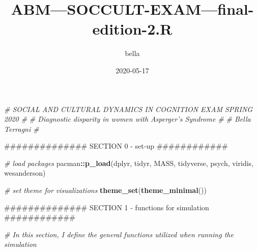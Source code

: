 \documentclass[]{article}
\title{ABM---SOCCULT-EXAM---final-edition-2.R}
\author{bella}
\date{2020-05-17}
\newenvironment{Shaded}{\begin{snugshade}}{\end{snugshade}}
\newcommand{\KeywordTok}[1]{\textcolor[rgb]{0.13,0.29,0.53}{\textbf{#1}}}
\newcommand{\CommentTok}[1]{\textcolor[rgb]{0.56,0.35,0.01}{\textit{#1}}}
\newcommand{\OperatorTok}[1]{\textcolor[rgb]{0.81,0.36,0.00}{\textbf{#1}}}
\newcommand{\NormalTok}[1]{#1}
\begin{document}
\maketitle

\begin{Shaded}
\begin{Highlighting}[]
\CommentTok{# SOCIAL AND CULTURAL DYNAMICS IN COGNITION EXAM SPRING 2020 #}
\CommentTok{# Diagnostic disparity in women with Asperger's Syndrome #}
\CommentTok{# Bella Terragni #}


\NormalTok{############## SECTION 0 - set-up ############}

\CommentTok{# load packages}
\NormalTok{pacman}\OperatorTok{::}\KeywordTok{p_load}\NormalTok{(dplyr, tidyr, MASS, tidyverse, psych, viridis, wesanderson)}

\CommentTok{# set theme for visualizations}
\KeywordTok{theme_set}\NormalTok{(}\KeywordTok{theme_minimal}\NormalTok{())}



\NormalTok{############## SECTION 1 - functions for simulation ############}

\CommentTok{# In this section, I define the general functions utilized when running the simulation}


\end{Highlighting}
\end{Shaded}
\end{document}

